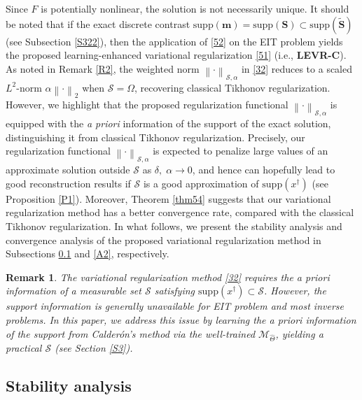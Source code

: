 \documentclass[11pt]{article}
\newcommand{\wih}{\widehat}
\newcommand{\wit}{\widetilde}
\newcommand{\Calderon}{Calder\'{o}n}
\newcommand{\bds}[1]{\boldsymbol{#1}}
\newtheorem{remark}{Remark}[section]
\begin{document}
Since $ F $ is potentially nonlinear, the solution is not necessarily unique.
It should be noted that if the exact discrete contrast $ \mathrm{supp}(\bds{m})= \mathrm{supp}(\bds{S})\subset \mathrm{supp}(\wit{\bds{S}}) $ (see Subsection \ref{S322}), then the application of \eqref{52} on the EIT problem yields the proposed learning-enhanced variational regularization \eqref{51} (i.e., \textbf{LEVR-C}).
As noted in Remark \ref{R2}, the weighted norm $ \left\|\cdot\right\|_{\mathcal{S}, \alpha} $ in \eqref{32} reduces to a scaled $ L^2 $-norm $ \alpha\left\|\cdot\right\|_2 $ when $ \mathcal{S}=\Omega $, recovering classical Tikhonov regularization.
However, we highlight that the proposed regularization functional $ \left\|\cdot\right\|_{\mathcal{S}, \alpha} $ is equipped with the \textit{a priori} information of the support of the exact solution, distinguishing it from classical Tikhonov regularization.
Precisely, our regularization functional $ \left\|\cdot\right\|_{\mathcal{S}, \alpha} $ is expected to penalize large values of an approximate solution outside $\mathcal{S}$ as $\delta,\; \alpha\to 0$, and hence can hopefully lead to good reconstruction results if $\mathcal{S}$ is a good approximation of $ \mathrm{supp}(x^\dagger)$ (see Proposition \ref{P1}).
Moreover, Theorem \ref{thm54} suggests that our variational regularization method has a better convergence rate, compared with the classical Tikhonov regularization.
In what follows, we present the stability analysis and convergence analysis of the proposed variational regularization method in Subsections \ref{A1} and \ref{A2}, respectively.

\begin{remark}\rm
The variational regularization method \eqref{32} requires the \textit{a priori} information of a measurable set $\mathcal{S}$ satisfying $ \mathrm{supp}(x^\dagger)\subset\mathcal{S} $.
However, the support information is generally unavailable for EIT problem and most inverse problems.
In this paper, we address this issue by learning the \textit{a priori} information of the support from \Calderon's method via the well-trained $\mathcal{M}_{\wih{\Theta}}$, yielding a practical $\mathcal{S}$ (see Section \ref{S3}).
\end{remark}


\subsection{Stability analysis}\label{A1}
\end{document}
